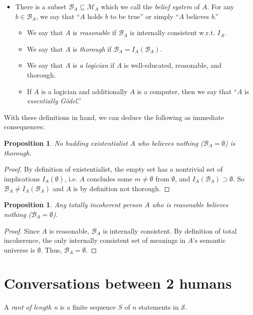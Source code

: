 \documentclass[12pt]{article}
\newtheorem{prop}[thm]{Proposition}
\begin{document}
\begin{itemize}
\item There is a subset $\mathcal{B}_A\subseteq \mathcal{M}_A$ which we call the \textit{belief system} of $A$.  For any $b\in\mathcal{B}_A$, we say that ``$A$ holds $b$ to be true'' or simply ``$A$ believes $b$.''
\begin{itemize}
\item We say that $A$ is \textit{reasonable} if $\mathcal{B}_A$ is internally consistent w.r.t. $I_A$.
\item We say that $A$ is \textit{thorough} if $\mathcal{B}_A=I_A(\mathcal{B}_A)$.
\item We say that $A$ is \textit{a logician} if $A$ is well-educated, reasonable, and thorough.
\item If $A$ is a logician and additionally $A$ is a computer, then we say that ``$A$ is \textit{essentially G\"odel}.''
\end{itemize}
\end{itemize}
With these definitions in hand, we can deduce the following as immediate consequences:
\begin{prop}
No budding existentialist $A$ who believes nothing ($\mathcal{B}_A=\emptyset$) is thorough.
\end{prop}
\begin{proof}
By definition of existentialist, the empty set has a nontrivial set of implications $I_A(\emptyset)$, i.e. $A$ concludes some $m\neq\emptyset$ from $\emptyset$, and $I_A(\mathcal{B}_A)\supset\emptyset$.  So $\mathcal{B}_A\neq I_A(\mathcal{B}_A)$ and $A$ is by definition not thorough.
\end{proof}
\begin{prop}
Any totally incoherent person $A$ who is reasonable believes nothing ($\mathcal{B}_A=\emptyset$).
\end{prop}
\begin{proof}
Since $A$ is reasonable, $\mathcal{B}_A$ is internally consistent.  By definition of total incoherence, the only internally consistent set of meanings in $A$'s semantic universe is $\emptyset$.  Thus, $\mathcal{B}_A=\emptyset$.
\end{proof}

\pagebreak
\section{Conversations between 2 humans}
\paragraph*{}
A \textit{rant of length n} is a finite sequence $S$ of $n$ statements in $\mathcal{S}$.
\end{document}
